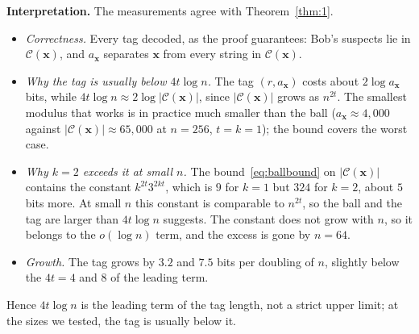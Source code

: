 \documentclass[journal,10pt]{IEEEtran}
\newcommand{\C}{\mathcal{C}}
\newcommand{\bx}{\mathbf{x}}
\begin{document}
\textbf{Interpretation.} The measurements agree with Theorem~\ref{thm:1}.
\begin{itemize}
\item \emph{Correctness.} Every tag decoded, as the proof guarantees: Bob's suspects lie in $\C(\bx)$, and $a_{\bx}$ separates $\bx$ from every string in $\C(\bx)$.
\item \emph{Why the tag is usually below $4t\log n$.} The tag $(r,a_{\bx})$ costs about $2\log a_{\bx}$ bits, while $4t\log n\approx2\log|\C(\bx)|$, since $|\C(\bx)|$ grows as $n^{2t}$. The smallest modulus that works is in practice much smaller than the ball ($a_{\bx}\approx4{,}000$ against $|\C(\bx)|\approx65{,}000$ at $n=256$, $t=k=1$); the bound covers the worst case.
\item \emph{Why $k=2$ exceeds it at small $n$.} The bound~\eqref{eq:ballbound} on $|\C(\bx)|$ contains the constant $k^{2t}3^{2kt}$, which is $9$ for $k=1$ but $324$ for $k=2$, about $5$ bits more. At small $n$ this constant is comparable to $n^{2t}$, so the ball and the tag are larger than $4t\log n$ suggests. The constant does not grow with $n$, so it belongs to the $o(\log n)$ term, and the excess is gone by $n=64$.
\item \emph{Growth.} The tag grows by $3.2$ and $7.5$ bits per doubling of $n$, slightly below the $4t=4$ and $8$ of the leading term.
\end{itemize}
Hence $4t\log n$ is the leading term of the tag length, not a strict upper limit; at the sizes we tested, the tag is usually below it.

\end{document}
